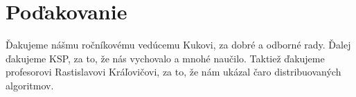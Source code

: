 \section*{Poďakovanie}

Ďakujeme nášmu ročníkovému vedúcemu Kukovi, za dobré a odborné rady. 
Ďalej ďakujeme KSP, za to, že nás vychovalo a mnohé naučilo. Taktiež ďakujeme profesorovi Rastislavovi Kráľovičovi,
za to, že nám ukázal čaro distribuovaných algoritmov.
